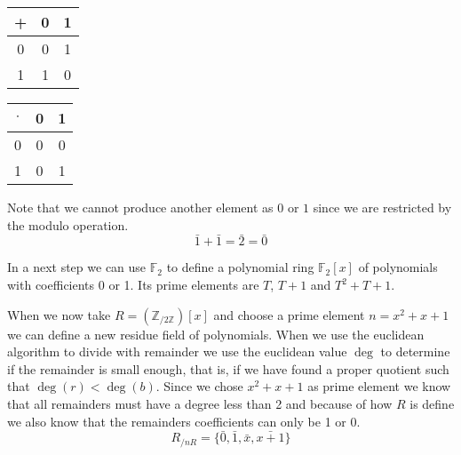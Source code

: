 \begin{example}
   \begin{center}
      \renewcommand\arraystretch{1.3}
      \begin{tabular}{c|c c}
         +   & 0   & 1 \\ \hline
         0   & 0   & 1 \\
         1   & 1   & 0 \\
      \end{tabular}
      \quad
      \begin{tabular}{c|c c}
         \(\cdot\) & 0   & 1 \\ \hline
         0         & 0   & 0 \\
         1         & 0   & 1 \\
      \end{tabular}
   \end{center}
   Note that we cannot produce another element as \(0\) or \(1\) since we are restricted by the modulo operation.
   \[\bar{1} + \bar{1} = \bar{2} = \bar{0}\]
\end{example}

In a next step we can use \(\mathbb{F}_2\) to define a polynomial ring \(\mathbb{F}_2 [x]\) of polynomials with coefficients 0 or 1.
Its prime elements are \(T\), \(T+1\) and \(T^2 + T + 1\).

When we now take \(R = (\mathbb{Z}_{/2\mathbb{Z}})[x]\) and choose a prime element \(n = x^2 + x + 1\) we can define a new residue field of polynomials.
When we use the euclidean algorithm to divide with remainder we use the euclidean value \(\deg\) to determine if the remainder is small enough, that is, if we have found a proper quotient such that \(\deg(r) < \deg(b)\).
Since we chose \(x^2 + x + 1\) as prime element we know that all remainders must have a degree less than 2 and because of how \(R\) is define we also know that the remainders coefficients can only be 1 or 0.
\[R_{/nR} = \{\bar{0}, \bar{1}, \bar{x}, \bar{x+1}\}\]

